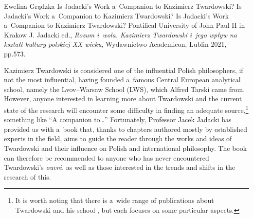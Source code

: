 \begin{newrevengenv}{Ewelina Grądzka}
	{Is Jadacki's Work a~Companion to Kazimierz Twardowski?}
	{Is Jadacki's Work a~Companion to Kazimierz Twardowski?}
	{Is Jadacki's Work a~Companion to Kazimierz Twardowski?}
	{Pontifical University of John Paul II in Krakow}
	{J. Jadacki ed., \textit{Rozum i~wola. Kazimierz Twardowski i~jego wpływ na kształt kultury polskiej XX wieku}, Wydawnictwo Academicon, Lublin 2021, pp.573.}




Kazimierz Twardowski is considered one of the influential Polish philosophers, if not the most influential, having founded a~famous Central European analytical school, namely the Lvov–Warsaw School (LWS), which Alfred Tarski came from. However, anyone interested in learning more about Twardowski and the current state of the research will encounter some difficulty in finding an adequate source,\footnote{It is worth noting that there is a~wide range of publications about Twardowski and his school
\parencites[e.g.,][]{wolenski_filozoficzna_1985}{wolenski_logic_1989}{poli_polish_1993}{brandl_actions_1999}{chybinska_tradition_2016}{brozek_significance_2017}{drabarek_interdisciplinary_2019},
but each focuses on some particular aspects. } something like ``A companion to…'' Fortunately, Professor Jacek Jadacki has provided us with a~book that, thanks to chapters authored mostly by established experts in the field, aims to guide the reader through the works and ideas of Twardowski and their influence on Polish and international philosophy. The book can therefore be recommended to anyone who has never encountered Twardowski's \textit{ouvré}, as well as those interested in the trends and shifts in the research of this.


\end{newrevengenv}
